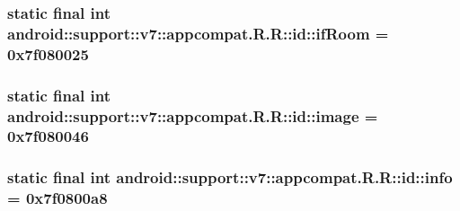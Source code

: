 \hypertarget{classandroid_1_1support_1_1v7_1_1appcompat_1_1_r_1_1id_ee4979c2428dad44e609358bc5c19fb5}{
\subsubsection[{ifRoom}]{\setlength{\rightskip}{0pt plus 5cm}static final int android::support::v7::appcompat.R.R::id::ifRoom = 0x7f080025}}
\label{classandroid_1_1support_1_1v7_1_1appcompat_1_1_r_1_1id_ee4979c2428dad44e609358bc5c19fb5}


\hypertarget{classandroid_1_1support_1_1v7_1_1appcompat_1_1_r_1_1id_8333242050b23b099e733b6b56c67ea4}{
\subsubsection[{image}]{\setlength{\rightskip}{0pt plus 5cm}static final int android::support::v7::appcompat.R.R::id::image = 0x7f080046}}
\label{classandroid_1_1support_1_1v7_1_1appcompat_1_1_r_1_1id_8333242050b23b099e733b6b56c67ea4}


\hypertarget{classandroid_1_1support_1_1v7_1_1appcompat_1_1_r_1_1id_7c0acc93b363e1933992079bb319e650}{
\subsubsection[{info}]{\setlength{\rightskip}{0pt plus 5cm}static final int android::support::v7::appcompat.R.R::id::info = 0x7f0800a8}}
\label{classandroid_1_1support_1_1v7_1_1appcompat_1_1_r_1_1id_7c0acc93b363e1933992079bb319e650}


